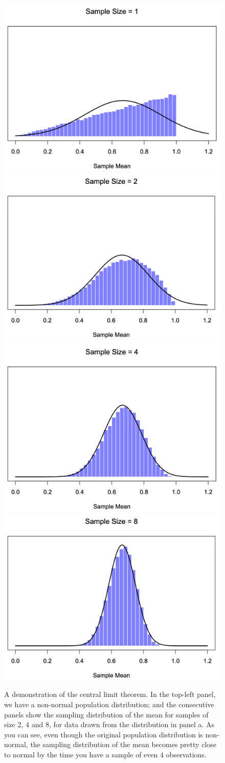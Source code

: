 \documentclass[
  11pt,
  a4paper,
  twoside,symmetric,openright]{book}
\theoremstyle{break}
\theoremstyle{break}
\begin{document}
\begin{figure}

{\centering \includegraphics[width=0.45\linewidth]{resources/image/cltDemo-a} \includegraphics[width=0.45\linewidth]{resources/image/cltDemo-b} \includegraphics[width=0.45\linewidth]{resources/image/cltDemo-c} \includegraphics[width=0.45\linewidth]{resources/image/cltDemo-d} 

}

\caption{A demonstration of the central limit theorem. In the top-left panel, we have a non-normal population distribution; and the consecutive panels show the sampling distribution of the mean for samples of size 2, 4 and 8, for data drawn from the distribution in panel a. As you can see, even though the original population distribution is non-normal, the sampling distribution of the mean becomes pretty close to normal by the time you have a sample of even 4 observations. }\label{fig:cltdemo}
\end{figure}
\end{document}
